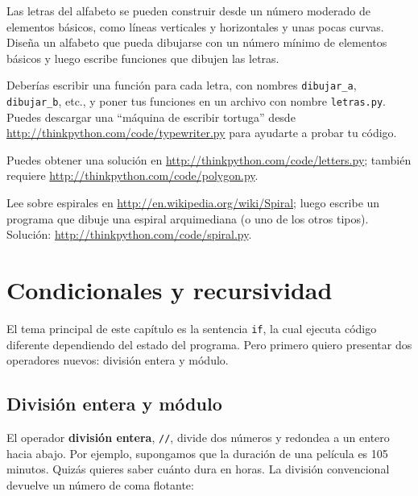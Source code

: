 \documentclass[10pt]{book}
\begin{document}
\begin{exercise}

Las letras del alfabeto se pueden construir desde un número moderado
de elementos básicos, como líneas verticales y horizontales y unas pocas
curvas.  Diseña un alfabeto que pueda dibujarse con un número
mínimo de elementos básicos y luego escribe funciones que dibujen las letras.

Deberías escribir una función para cada letra, con nombres
\verb"dibujar_a", \verb"dibujar_b", etc., y poner tus funciones
en un archivo con nombre {\tt letras.py}.  Puedes descargar una
``máquina de escribir tortuga'' desde \url{http://thinkpython.com/code/typewriter.py}
para ayudarte a probar tu código.

Puedes obtener una solución en \url{http://thinkpython.com/code/letters.py};
también requiere
\url{http://thinkpython.com/code/polygon.py}.

\end{exercise}

\begin{exercise}

Lee sobre espirales en \url{http://en.wikipedia.org/wiki/Spiral}; luego
escribe un programa que dibuje una espiral arquimediana (o uno de los otros
tipos).  Solución: \url{http://thinkpython.com/code/spiral.py}.

\end{exercise}


\chapter{Condicionales y recursividad}

El tema principal de este capítulo es la sentencia {\tt if}, la cual
ejecuta código diferente dependiendo del estado del programa.
Pero primero quiero presentar dos operadores nuevos: división entera
y módulo.


\section{División entera y módulo}

El operador {\bf división entera}, \verb"//", divide
dos números y redondea a un entero hacia abajo.  Por ejemplo, supongamos que la
duración de una película es 105 minutos.  Quizás quieres saber
cuánto dura en horas.  La división convencional
devuelve un número de coma flotante:
\end{document}
